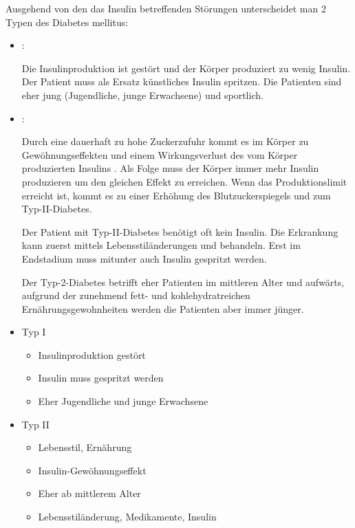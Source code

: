 


{%
Ausgehend von den das Insulin betreffenden Störungen 
unterscheidet man 2 Typen des Diabetes
mellitus:
\begin{itemize}
  \item {}:   
  
  Die Insulinproduktion ist gestört
  und der Körper produziert zu wenig Insulin. Der Patient
  muss als Ersatz künstliches Insulin spritzen.  Die Patienten
  sind eher jung (Jugendliche, junge Erwachsene) und
  sportlich.
  
  
  \item {}:
  
  Durch eine
  dauerhaft zu hohe Zuckerzufuhr kommt es im Körper zu
  Gewöhnungseffekten und einem Wirkungsverlust des vom
  Körper produzierten Insulins . Als
  Folge muss der Körper immer mehr Insulin produzieren um
  den gleichen Effekt zu erreichen. Wenn das
  Produktionslimit erreicht ist, kommt es zu einer Erhöhung
  des Blutzuckerspiegels und zum Typ-II-Diabetes.
  
  Der Patient mit Typ-II-Diabetes benötigt oft kein Insulin.
  Die Erkrankung kann zuerst mittels Lebensstiländerungen
  und  behandeln. Erst im Endstadium muss
  mitunter auch Insulin gespritzt werden.
  
  Der Typ-2-Diabetes betrifft eher Patienten im mittleren
  Alter und aufwärts, aufgrund der zunehmend fett- und
  kohlehydratreichen Ernährungsgewohnheiten werden die
  Patienten aber immer jünger.
\end{itemize}
}{
\begin{itemize}
  \item Typ I
  \begin{itemize}
    \item Insulinproduktion gestört
    \item Insulin muss gespritzt werden
    \item Eher Jugendliche und junge Erwachsene
  \end{itemize}
  \item Typ II
  \begin{itemize}
    \item Lebensstil, Ernährung
    \item Insulin-Gewöhnungseffekt
    \item Eher ab mittlerem Alter
    \item Lebensstiländerung, Medikamente, Insulin
  \end{itemize}
\end{itemize}
}{}{}{}


